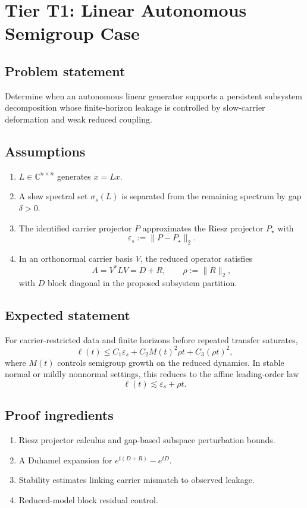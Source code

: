 \section{Tier T1: Linear Autonomous Semigroup Case}

\subsection{Problem statement}
Determine when an autonomous linear generator supports a persistent subsystem decomposition whose finite-horizon leakage is controlled by slow-carrier deformation and weak reduced coupling.

\subsection{Assumptions}
\begin{enumerate}
\item $L \in \mathbb{C}^{n \times n}$ generates $\dot x = Lx$.
\item A slow spectral set $\sigma_s(L)$ is separated from the remaining spectrum by gap $\delta > 0$.
\item The identified carrier projector $P$ approximates the Riesz projector $P_\star$ with
\[
\varepsilon_s := \|P - P_\star\|_2.
\]
\item In an orthonormal carrier basis $V$, the reduced operator satisfies
\[
A = V^\ast L V = D + R,
\qquad
\rho := \|R\|_2,
\]
with $D$ block diagonal in the proposed subsystem partition.
\end{enumerate}

\subsection{Expected statement}
For carrier-restricted data and finite horizons before repeated transfer saturates,
\[
\ell(t) \le C_1 \varepsilon_s + C_2 M(t)^2 \rho t + C_3 (\rho t)^2,
\]
where $M(t)$ controls semigroup growth on the reduced dynamics. In stable normal or mildly nonnormal settings, this reduces to the affine leading-order law
\[
\ell(t) \lesssim \varepsilon_s + \rho t.
\]

\subsection{Proof ingredients}
\begin{enumerate}
\item Riesz projector calculus and gap-based subspace perturbation bounds.
\item A Duhamel expansion for $e^{t(D+R)} - e^{tD}$.
\item Stability estimates linking carrier mismatch to observed leakage.
\item Reduced-model block residual control.
\end{enumerate}

